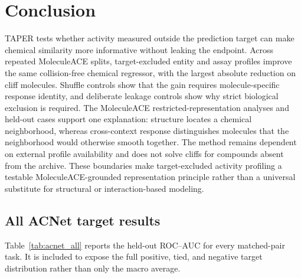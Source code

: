 \documentclass[manuscript,nonacm]{acmart}
\newcommand{\method}{TAPER\xspace}
\begin{document}
\section{Conclusion}
\method tests whether activity measured outside the prediction target can make
chemical similarity more informative without leaking the endpoint. Across
repeated MoleculeACE splits, target-excluded entity and assay profiles improve
the same collision-free chemical regressor, with the largest absolute reduction
on cliff molecules. Shuffle controls show that the gain requires
molecule-specific response identity, and deliberate leakage controls show why
strict biological exclusion is required. The MoleculeACE
restricted-representation analyses and held-out cases support one explanation:
structure locates a chemical neighborhood, whereas cross-context response
distinguishes molecules that the neighborhood would otherwise smooth together.
The method remains dependent on external profile availability and does not solve
cliffs for compounds absent from the archive. These boundaries make
target-excluded activity profiling a testable MoleculeACE-grounded
representation principle rather than a universal substitute for structural or
interaction-based modeling.




\clearpage
\onecolumn
\appendix
\begin{landscape}
\section{All ACNet target results}
Table~\ref{tab:acnet_all} reports the held-out ROC--AUC for every matched-pair
task. It is included to expose the full positive, tied, and negative target
distribution rather than only the macro average.
\fontsize{6.2}{6.35}\selectfont
\setlength{\tabcolsep}{3.0pt}

\normalsize
\end{landscape}
\end{document}
